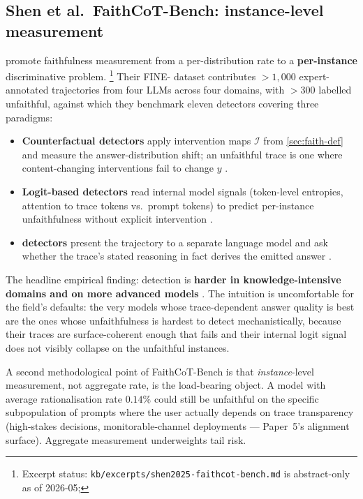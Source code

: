 \subsection{Shen et al.\ FaithCoT-Bench: instance-level measurement}
\label{sec:faith-bench}

\citet{shen2025-faithcot-bench} promote faithfulness measurement from a
per-distribution rate to a \textbf{per-instance} discriminative
problem.%
\footnote{Excerpt status:
\texttt{kb/excerpts/shen2025-faithcot-bench.md} is abstract-only as of
2026-05; } Their FINE- dataset contributes
$> 1{,}000$ expert-annotated trajectories from four LLMs across four
domains, with $> 300$ labelled unfaithful, against which they
benchmark eleven detectors covering three paradigms:
\begin{itemize}
\item \textbf{Counterfactual detectors} apply intervention maps
$\mathcal{I}$ from \cref{sec:faith-def} and measure the answer-distribution
shift; an unfaithful trace is one where content-changing interventions
fail to change $y$ \citep[\S 3]{shen2025-faithcot-bench}.
\item \textbf{Logit-based detectors} read internal model signals
(token-level entropies, attention to trace tokens vs.\ prompt tokens)
to predict per-instance unfaithfulness without explicit intervention
\citep[\S 3]{shen2025-faithcot-bench}.
\item \textbf{ detectors} present the trajectory to a
separate language model and ask whether the trace's stated reasoning
in fact derives the emitted answer
\citep[\S 3]{shen2025-faithcot-bench}.
\end{itemize}
The headline empirical finding: detection is \textbf{harder in
knowledge-intensive domains and on more advanced models}
\citep[abstract]{shen2025-faithcot-bench}. The intuition is uncomfortable
for the field's defaults: the very models whose trace-dependent answer
quality is best are the ones whose unfaithfulness is hardest to detect
mechanistically, because their traces are surface-coherent enough that
 fails and their internal logit signal does not visibly
collapse on the unfaithful instances.

A second methodological point of FaithCoT-Bench is that
\emph{instance}-level measurement, not aggregate rate, is the
load-bearing object. A model with average rationalisation rate $0.14\%$
\citep[\S 4]{mehta2026-faithfulness-scaling} could still be unfaithful
on the specific subpopulation of prompts where the user actually depends
on trace transparency (high-stakes decisions, monitorable-channel
deployments — Paper~5's alignment surface). Aggregate measurement
underweights tail risk.

